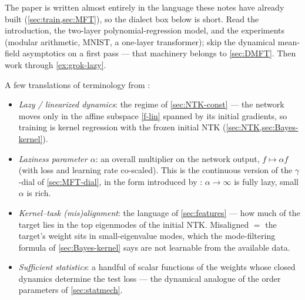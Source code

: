 \documentclass[11pt]{article}
\begin{document}
The paper is written almost entirely in the language these notes have already built (\cref{sec:train,sec:MFT}), so the dialect box below is short. Read the introduction, the two-layer polynomial-regression model, and the experiments (modular arithmetic, MNIST, a one-layer transformer); skip the dynamical mean-field asymptotics on a first pass --- that machinery belongs to \cref{sec:DMFT}. Then work through \cref{ex:grok-lazy}.

\begin{callout}[note]
A few translations of terminology from \cite{kumar2024grokking}:
\begin{itemize}
    \item \emph{Lazy / linearized dynamics}: the regime of \cref{sec:NTK-const} --- the network moves only in the affine subspace \eqref{f-lin} spanned by its initial gradients, so training is kernel regression with the frozen initial NTK (\cref{sec:NTK,sec:Bayes-kernel}).
    \item \emph{Laziness parameter $\alpha$}: an overall multiplier on the network output, $f \mapsto \alpha f$ (with loss and learning rate co-scaled). This is the continuous version of the $\gamma$-dial of \cref{sec:MFT-dial}, in the form introduced by \cite{chizat2019lazy}: $\alpha\to\infty$ is fully lazy, small $\alpha$ is rich.
    \item \emph{Kernel--task (mis)alignment}: the language of \cref{sec:features} --- how much of the target lies in the top eigenmodes of the initial NTK. Misaligned $=$ the target's weight sits in small-eigenvalue modes, which the mode-filtering formula of \cref{sec:Bayes-kernel} says are not learnable from the available data.
    \item \emph{Sufficient statistics}: a handful of scalar functions of the weights whose closed dynamics determine the test loss --- the dynamical analogue of the order parameters of \cref{sec:statmech}.
\end{itemize}
\end{callout}
\end{document}
